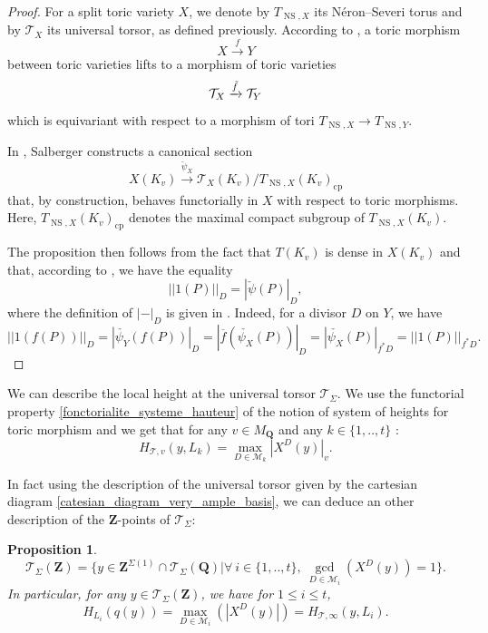 \documentclass{proc-l}
\newcommand{\Z}{\mathbf{Z}}
\newcommand{\Q}{\mathbf{Q}}
\DeclareMathOperator{\NS}{NS}
\newcommand{\stackT}{\mathcal{T}}
\newtheorem{prop}[theorem]{Proposition}
\theoremstyle{definition}
\theoremstyle{remark}
\numberwithin{equation}{section}
\begin{document}
\begin{proof}
For a split toric variety $X$, we denote by $T_{\NS,X}$ its Néron–Severi torus and by $\stackT_X$ its universal torsor, as defined previously. 
According to \cite[section 3]{geraschenko_satriano_stacky_fan}, a toric morphism 
$$X \xrightarrow{f} Y$$ 
between toric varieties lifts to a morphism of toric varieties 
$$\stackT_{X} \xrightarrow{\Tilde{f}} \stackT_{Y}$$ 
which is equivariant with respect to a morphism of tori $T_{\NS,X} \rightarrow T_{\NS,Y}$. 

In \cite[theorem 9.5]{salberger_torsor}, Salberger constructs a canonical section 
$$X(K_v) \xrightarrow{\check{\psi}_X} \stackT_X(K_v) / T_{\NS,X}(K_v)_{\mathrm{cp}}$$ 
that, by construction, behaves functorially in $X$ with respect to toric morphisms. 
Here, $T_{\NS,X}(K_v)_{\mathrm{cp}}$ denotes the maximal compact subgroup of $T_{\NS,X}(K_v)$. 

The proposition then follows from the fact that $T(K_v)$ is dense in $X(K_v)$ and that, according to \cite[proposition 9.7]{salberger_torsor}, we have the equality 
$$||1(P)||_D = | \check{\psi}(P) |_D,$$ 
where the definition of $|-|_D$ is given in \cite[notations 9.6]{salberger_torsor}. 
Indeed, for a divisor $D$ on $Y$, we have
$$||1(f(P))||_D =  | \check{\psi_Y}(f(P)) |_D = | \overline{f}(\check{\psi_X}(P)) |_D = | \check{\psi_X}(P) |_{f^* D} = ||1(P)||_{f^*D}.$$

\end{proof}

We can describe the local height at the universal torsor $\stackT_{\Sigma}$. We use the functorial property \ref{fonctorialite_systeme_hauteur} of the notion of system of heights for toric morphism and we get that for any $v \in M_{\Q}$ and any $k \in \{ 1,..,t \}$ :
$$ H_{\stackT,v}(y,L_k) = \max\limits_{D \in \mathcal{M}_k} |X^D(y)|_v .$$

In fact using the description of the universal torsor given by the cartesian diagram \ref{catesian_diagram_very_ample_basis}, we can deduce an other description of the $\Z$-points of $\stackT_{\Sigma}$:

\begin{prop}\label{description_universal_torsor_toric_varieties}
    \ \vspace{0,1 cm}
    $$ \stackT_{\Sigma}(\Z) = \{ y \in \Z^{\Sigma(1)} \cap  \stackT_{\Sigma}(\Q)  | \forall \ i \in \{1,..,t \}, \ \gcd\limits_{D \in \mathcal{M}_i}(X^{D}(y)) = 1 \} .$$
    In particular, for any $y \in \stackT_{\Sigma}(\Z)$, we have for $1 \leqslant i \leqslant t$,
    $$ H_{L_i}(q(y)) = \max\limits_{D \in \mathcal{M}_i}(|X^{D}(y)|) = H_{\stackT,\infty}(y,L_i) .$$
\end{prop}
    
\end{document}

